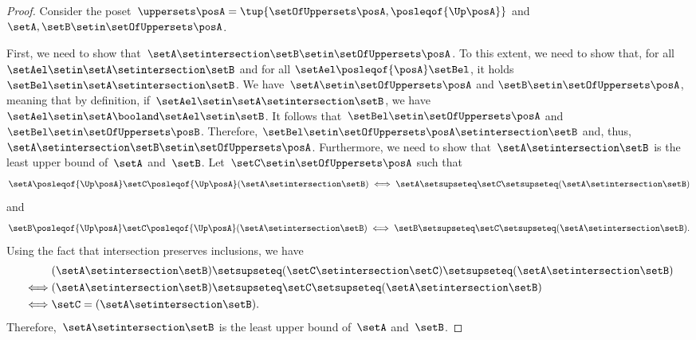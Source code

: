 \begin{proof}
    Consider the poset~$\uppersets \posA=\tup{\setOfUppersets \posA,{{\posleqof{\Up \posA}}}}$ and~$\setA,\setB\setin \setOfUppersets \posA$.

    First, we need to show that~$\setA\setintersection \setB\setin \setOfUppersets \posA$. To this extent, we need to show that, for all $\setAel \setin \setA\setintersection \setB$ and for all $\setAel \posleqof{\posA} \setBel$, it holds $\setBel \setin \setA\setintersection \setB$.
    We have~$\setA \setin \setOfUppersets \posA$ and $\setB\setin \setOfUppersets \posA$, meaning that by definition, if~$\setAel\setin \setA\setintersection \setB$, we have~$\setAel \setin \setA \booland \setAel \setin \setB$.
    It follows that~$\setBel \setin \setOfUppersets \posA$ and $\setBel \setin \setOfUppersets \posB$. Therefore, $\setBel \setin \setOfUppersets \posA \setintersection \setB$ and, thus, $\setA\setintersection \setB\setin \setOfUppersets \posA$. 
    Furthermore, we need to show that~$\setA\setintersection \setB$ is the least upper bound of~$\setA$ and~$\setB$.
    Let~$\setC\setin \setOfUppersets \posA$ such that~
\[
\setA\posleqof{\Up \posA} \setC \posleqof{\Up \posA} (\setA\setintersection \setB)
\iff
\setA\setsupseteq \setC\setsupseteq (\setA\setintersection \setB)
\]
and
\[
\setB \posleqof{\Up \posA} \setC \posleqof{\Up \posA} (\setA\setintersection \setB)
\iff
\setB\setsupseteq \setC\setsupseteq (\setA\setintersection \setB).
\]
    Using the fact that intersection preserves inclusions, we have
    \begin{equation*}
        \begin{aligned}
            &(\setA\setintersection \setB)
                                           \setsupseteq (\setC\setintersection \setC) \setsupseteq (\setA\setintersection \setB ) \\
            \iff& (\setA\setintersection \setB)  \setsupseteq \setC \setsupseteq (\setA\setintersection \setB ) \\
            \iff&\setC                          = (\setA\setintersection \setB).
        \end{aligned}
    \end{equation*}
    Therefore,~$\setA\setintersection \setB$ is the least upper bound of~$\setA$ and~$\setB$.


\end{proof}

